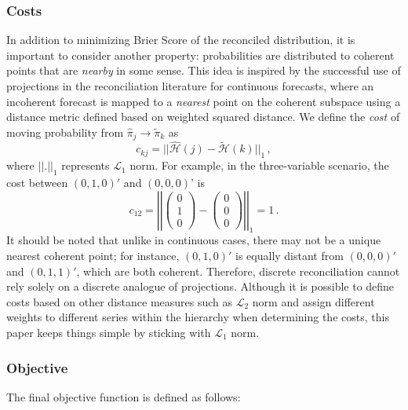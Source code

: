 \documentclass[a4paper,review,12pt,authoryear]{elsarticle}
\begin{document}
    \subsubsection*{\textbf{Costs}}
    In addition to minimizing Brier Score of the reconciled distribution, it is important to consider another property: probabilities are distributed to coherent points that are \emph{nearby} in some sense.
    This idea is inspired by the successful use of projections in the reconciliation literature for continuous forecasts, where an incoherent forecast is mapped to  a \emph{nearest} point on the coherent subspace using a distance metric defined based on weighted squared distance.
    We define the \emph{cost} of moving probability from $\hat{\pi}_j\rightarrow\tilde{\pi}_k$ as
    \[
    c_{kj}=||\hat{\mathcal{H}}(j)-\tilde{\mathcal{H}}(k)||_1\,,
    \]
    where $||.||_1$ represents $\mathcal{L}_1$ norm. For example, in the three-variable scenario, the cost between $(0, 1, 0)'$ and $(0, 0, 0)$' is
    \[
    c_{12}=\left|\left|\begin{pmatrix}0\\1\\0\end{pmatrix}-\begin{pmatrix}0\\0\\0\end{pmatrix}\right|\right|_1=1\,.
    \]
    It should be noted that unlike in continuous cases, there may not be a unique nearest coherent point; for instance, $(0,1,0)'$ is equally distant from $(0,0,0)'$ and $(0,1,1)'$, which are both coherent.
    Therefore, discrete reconciliation cannot rely solely on a discrete analogue of projections.
    Although it is possible to define costs based on other distance measures such as  $\mathcal{L}_2$ norm and assign different weights to different series within the hierarchy when determining the costs, this paper keeps things simple by sticking with  $\mathcal{L}_1$ norm.


    \subsubsection*{\textbf{Objective}}

    The final objective function is defined as follows:
\end{document}

